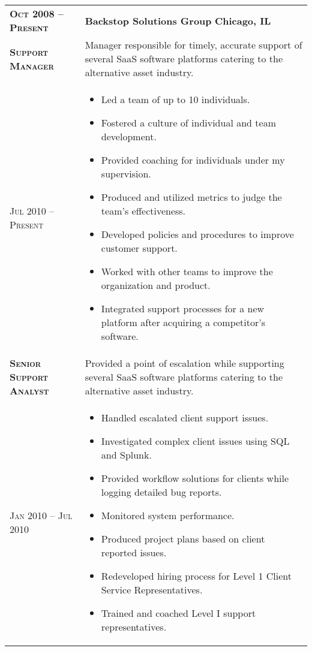 \documentclass[a4paper, oneside, final]{scrartcl} %
\newcommand{\gray}{\rowcolor[gray]{.90}} %
\begin{document}
\begin{center}
\begin{tabularx}{0.97\linewidth}{>{\raggedright\scshape}p{3.4cm}X}
\gray \textbf{Oct 2008 -- Present} & \textbf{Backstop Solutions Group} \hfill \textbf{Chicago, IL}\\ 
\textbf{Support Manager} & Manager responsible for timely, accurate support of several SaaS software platforms catering to the alternative asset industry.\\
Jul 2010 -- Present & \vspace{-6mm}
\begin{itemize}
\setlength{\itemsep}{0cm}%
\setlength{\parskip}{0cm}%
\item Led a team of up to 10 individuals.
\item Fostered a culture of individual  and team development.
\item Provided coaching for individuals under my supervision.
\item Produced and utilized metrics to judge the team's effectiveness.
\item Developed policies and procedures to improve customer support.
\item Worked with other teams to improve the organization and product.
\item Integrated support processes for a new platform after acquiring a competitor's software. 
\end{itemize}\\
\textbf{Senior Support Analyst} & Provided a point of escalation while supporting several SaaS software platforms catering to the alternative asset industry.\\
Jan 2010 -- Jul 2010 & \vspace{-6mm}
\begin{itemize}
\setlength{\itemsep}{0cm}%
\setlength{\parskip}{0cm}%
\item Handled escalated client support issues.
\item Investigated complex client issues using SQL and Splunk.
\item Provided workflow solutions for clients while logging detailed bug reports.
\item Monitored system performance.
\item Produced project plans based on client reported issues.
\item Redeveloped hiring process for Level 1 Client Service Representatives.
\item Trained and coached Level I support representatives.
\end{itemize}\\

\end{tabularx}
\end{center}
\end{document}
